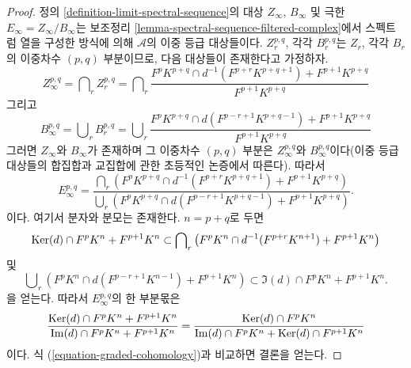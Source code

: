 \begin{proof}
정의 \ref{definition-limit-spectral-sequence}의 대상 $Z_\infty$,
$B_\infty$ 및 극한 $E_\infty = Z_\infty/B_\infty$는 보조정리
\ref{lemma-spectral-sequence-filtered-complex}에서 스펙트럼 열을 구성한
방식에 의해 $\mathcal{A}$의 이중 등급 대상들이다. $Z_r^{p, q}$,
각각 $B_r^{p, q}$는 $Z_r$, 각각 $B_r$의 이중차수 $(p, q)$ 부분이므로,
다음 대상들이 존재한다고 가정하자.
$$
Z_\infty^{p, q} = \bigcap\nolimits_r Z_r^{p, q} =
\bigcap\nolimits_r
\frac{F^pK^{p + q} \cap d^{-1}(F^{p + r}K^{p + q + 1}) + F^{p + 1}K^{p + q}}
{F^{p + 1}K^{p + q}}
$$
그리고
$$
B_\infty^{p, q} = \bigcup\nolimits_r B_r^{p, q} =
\bigcup\nolimits_r
\frac{F^pK^{p + q} \cap d(F^{p - r + 1}K^{p + q - 1}) + F^{p + 1}K^{p + q}}
{F^{p + 1}K^{p + q}}
$$
그러면 $Z_\infty$와 $B_\infty$가 존재하며 그 이중차수 $(p, q)$ 부분은
$Z_\infty^{p, q}$와 $B_\infty^{p, q}$이다(이중 등급 대상들의 합집합과
교집합에 관한 초등적인 논증에서 따른다). 따라서
$$
E_\infty^{p, q} =
\frac{\bigcap_r (F^pK^{p + q} \cap d^{-1}(F^{p + r}K^{p + q + 1})
+ F^{p + 1}K^{p + q})}
{\bigcup_r (F^pK^{p + q} \cap d(F^{p - r + 1}K^{p + q - 1})
+ F^{p + 1}K^{p + q})}.
$$
이다. 여기서 분자와 분모는 존재한다.
$n = p + q$로 두면
\begin{equation}
\label{equation-on-top-bigraded}
\mathop{\mathrm{Ker}}(d) \cap F^pK^{n} + F^{p + 1}K^{n}
\subset
\bigcap\nolimits_r
\left(
F^pK^{n} \cap d^{-1}(F^{p + r}K^{n + 1}) + F^{p + 1}K^{n}
\right)
\end{equation}
및
\begin{equation}
\label{equation-at-bottom-bigraded}
\bigcup\nolimits_r
\left(
F^pK^{n} \cap d(F^{p - r + 1}K^{n - 1}) + F^{p + 1}K^{n}
\right)
\subset
\Im(d) \cap F^pK^{n} + F^{p + 1}K^{n}.
\end{equation}
을 얻는다. 따라서 $E_\infty^{p, q}$의 한 부분몫은
$$
\frac{\mathop{\mathrm{Ker}}(d) \cap F^pK^{n} + F^{p + 1}K^n}
{\mathop{\mathrm{Im}}(d) \cap F^pK^{n} + F^{p + 1}K^{n}} =
\frac{\mathop{\mathrm{Ker}}(d) \cap F^pK^n}{\mathop{\mathrm{Im}}(d) \cap F^pK^n + \mathop{\mathrm{Ker}}(d) \cap F^{p + 1}K^n}
$$
이다. 식 (\ref{equation-graded-cohomology})과 비교하면 결론을 얻는다.
\end{proof}

